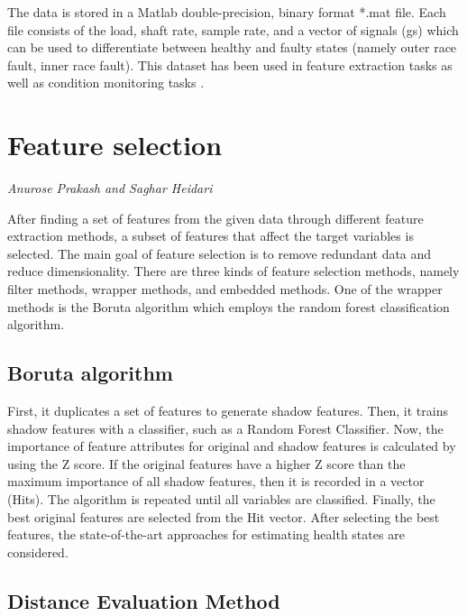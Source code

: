 The data is stored in a Matlab double-precision, binary format *.mat file. Each file consists of the load, shaft rate, sample rate, and a vector of signals (gs) which can be used to differentiate between healthy and faulty states (namely outer race fault, inner race fault). This dataset has been used in feature extraction tasks as well as condition monitoring tasks \cite{bechhoefer2016quick}.

\section{Feature selection}

\vspace*{-15mm}\hfill{\normalsize\emph{Anurose Prakash and Saghar Heidari}}

After finding a set of features from the given data through different feature extraction methods, a subset of features that affect the target variables is selected. The main goal of feature selection is to remove redundant data and reduce dimensionality.
There are three kinds of feature selection methods, namely filter methods, wrapper methods, and embedded methods. One of the wrapper methods is the Boruta algorithm \cite{hasan2020health} which employs the random forest classification algorithm.

\subsection{Boruta algorithm}
First, it duplicates a set of features to generate shadow features. Then, it trains shadow features with a classifier, such as a Random Forest Classifier. Now, the importance of feature attributes for original and shadow features is calculated by using the Z score. If the original features have a higher Z score than the maximum importance of all shadow features, then it is recorded in a vector (Hits). The algorithm is repeated until all variables are classified. Finally, the best original features are selected from the Hit vector. 
After selecting the best features, the state-of-the-art approaches for estimating health states are considered.

\subsection{Distance Evaluation Method}

